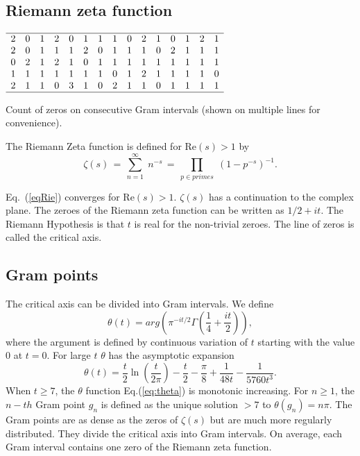 \documentclass[journal]{IEEEtai}
\begin{document}
\subsection{Riemann zeta function}


\begin{table}
\centering \(\begin{array}{ccccccccccccccc}
\hline
2& 0& 1& 2& 0& 1& 1& 1& 0& 2& 1& 0& 1& 2& 1 \\
2& 0& 1& 1& 1& 2& 0& 1& 1& 1& 0& 2& 1& 1& 1 \\
0& 2& 1& 2& 1& 0& 1& 1& 1& 1& 1& 1& 1& 1& 1 \\
1& 1& 1& 1& 1& 1& 1& 0& 1& 2& 1& 1& 1& 1& 0 \\
2& 1& 1& 0& 3& 1& 0& 2& 1& 1& 0& 1& 1& 1& 1 \\
\hline
\end{array}\)
\caption{Count of zeros on consecutive Gram intervals (shown on multiple lines for convenience).} 
\label{tab:sequence}
\end{table}


The Riemann Zeta function is defined for $\mathrm{Re} (s) > 1$ by
\begin{equation}
\zeta ( s ) \, = \, \sum^{\infty}_{n = 1} \; n^{-s} \, = \, \prod_{p \in primes} \;
\left( 1 - p^{-s} \right)^{-1}.
\label{eqRie}
\end{equation}

Eq.~(\ref{eqRie})  converges for $\mathrm{Re} (s) > 1$.  
 $\zeta ( s )$ has a  continuation
to the complex plane. The zeroes of the Riemann zeta function can be written as $1/2 + i t$. The Riemann Hypothesis  
is that $t$ is real for the non-trivial zeroes. The line of zeros is called the critical axis.

\subsection{Gram points}
The critical axis can be divided into Gram intervals. 
We define
\begin{equation}
\theta(t) = arg (\pi^{-it/2} \Gamma(\frac{1}{4} + \frac{it}{2})), 
\label{eq:theta}
\end{equation}
where the argument is defined by continuous variation of $t$ starting with the value $0$ at $t = 0$.
For large $t$ $\theta$ has the asymptotic expansion
\begin{equation}
\theta(t) = \frac{t}{2}\ln (\frac{t}{2\pi}) - \frac{t}{2} - \frac{\pi}{8} + \frac{1}{48t} - \frac{1}{5760t^3}. 
\label{eq:thetaAsymptotic}
\end{equation}
 When $t \ge 7$, the $\theta$ function Eq.(\ref{eq:theta}) is monotonic increasing. 
For $n \ge 1$, the $n-th$ Gram point $g_n$ is defined as the unique solution $> 7$ to
$\theta (g_n) = n\pi$.
The Gram points are as dense as the zeros of $\zeta(s)$ but are much more regularly distributed. They divide the critical axis into Gram intervals. On average, each Gram interval contains one zero of the Riemann zeta function.
\end{document}
